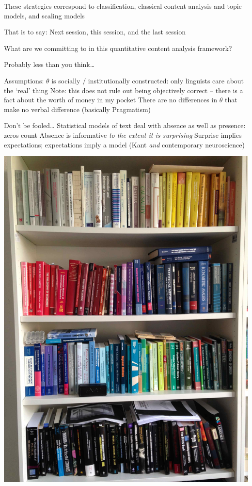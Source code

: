 \documentclass{mediumfoils}
\begin{document}
These strategies correspond to classification, classical content analysis and topic models, and scaling models

That is to say:
\ita
\itm Next session, this session, and the last session
\itz


What are we committing to in this quantitative content analysis framework?

Probably less than you think\ldots

Assumptions: 
\ita
\itm $\theta$ is socially / institutionally constructed: only linguists care about the `real' thing
\ita
\itm Note: this does not rule out being objectively correct -- there is a fact about the worth of money in my pocket
\itz
\itm There are no differences in $\theta$ that make no verbal difference (basically Pragmatism)
\itz


Don't be fooled\ldots
\ita
\itm Statistical models of text deal with absence as well as presence: zeros count
\itm Absence is informative \textit{to the extent it is surprising}
\itm Surprise implies expectations; expectations imply a model (Kant \textit{and} contemporary neuroscience)
\itz

\newpage

\centerline{\includegraphics[scale=.12]{pictures/distant-reading}}
\end{document}
